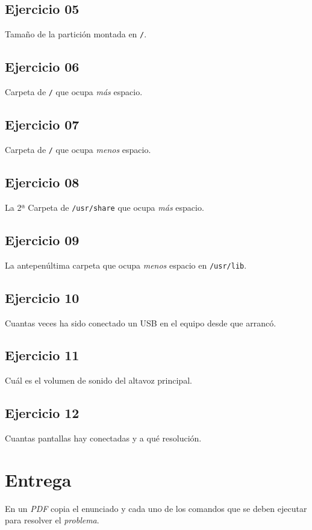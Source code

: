 \documentclass[11pt]{article}
\begin{document}
\subsection{Ejercicio 05}
\label{sec-2-5}

Tamaño de la partición montada en \verb~/~.

\subsection{Ejercicio 06}
\label{sec-2-6}

Carpeta de \verb~/~ que ocupa \emph{más} espacio.

\subsection{Ejercicio 07}
\label{sec-2-7}

Carpeta de \verb~/~ que ocupa \emph{menos} espacio.

\subsection{Ejercicio 08}
\label{sec-2-8}

La 2ª Carpeta de \verb~/usr/share~ que ocupa \emph{más} espacio.

\subsection{Ejercicio 09}
\label{sec-2-9}

La antepenúltima carpeta que ocupa \emph{menos} espacio en \verb~/usr/lib~.

\subsection{Ejercicio 10}
\label{sec-2-10}

Cuantas veces ha sido conectado un USB en el equipo desde que arrancó.

\subsection{Ejercicio 11}
\label{sec-2-11}

Cuál es el volumen de sonido del altavoz principal.

\subsection{Ejercicio 12}
\label{sec-2-12}

Cuantas pantallas hay conectadas y a qué resolución.

\section{Entrega}
\label{sec-3}

En un \emph{PDF} copia el enunciado y cada uno de los comandos que se deben
ejecutar para resolver el \emph{problema}.
\end{document}
